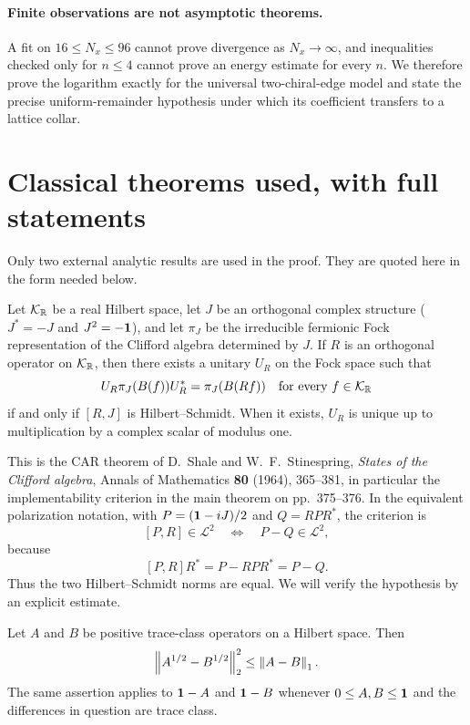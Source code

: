 \paragraph{Finite observations are not asymptotic theorems.}
A fit on $16\le N_x\le96$ cannot prove divergence as $N_x\to\infty$, and
inequalities checked only for $n\le4$ cannot prove an energy estimate for
every $n$.  We therefore prove the logarithm exactly for the universal
two-chiral-edge model and state the precise uniform-remainder hypothesis
under which its coefficient transfers to a lattice collar.

\section{Classical theorems used, with full statements}

Only two external analytic results are used in the proof.  They are
quoted here in the form needed below.

\begin{theorem}\label{thm:ss}
Let $\mathcal K_{\mathbb R}$ be a real Hilbert space, let $J$ be an orthogonal
complex structure ($J^*=-J$ and $J^2=-\mathbf 1$), and let $\pi_J$ be the
irreducible fermionic Fock representation of the Clifford algebra
determined by $J$.  If $R$ is an orthogonal operator on
$\mathcal K_{\mathbb R}$, then there exists a unitary $U_R$ on the Fock space
such that
\[
 U_R\pi_J(B(f))U_R^*=\pi_J(B(Rf))
 \quad\text{for every }f\in\mathcal K_{\mathbb R}
\]
if and only if $[R,J]$ is Hilbert--Schmidt.  When it exists, $U_R$ is
unique up to multiplication by a complex scalar of modulus one.
\end{theorem}

This is the CAR theorem of D.~Shale and W.~F.~Stinespring,
\emph{States of the Clifford algebra}, Annals of Mathematics
\textbf{80} (1964), 365--381, in particular the implementability
criterion in the main theorem on pp.~375--376.  In the equivalent
polarization notation, with $P=(\mathbf 1-iJ)/2$ and $Q=RPR^*$, the criterion
is
\[
 [P,R]\in\mathcal L^2
 \quad\Longleftrightarrow\quad
 P-Q\in\mathcal L^2,
\]
because
\[
 [P,R]R^*=P-RPR^*=P-Q.
\]
Thus the two Hilbert--Schmidt norms are equal.  We will verify the
hypothesis by an explicit estimate.

\begin{theorem}
\label{thm:ps}
Let $A$ and $B$ be positive trace-class operators on a Hilbert space.
Then
\[
 \left\lVert A^{1/2}-B^{1/2}\right\rVert_2^2\le \left\lVert A-B\right\rVert_1.
\]
The same assertion applies to $\mathbf 1-A$ and $\mathbf 1-B$ whenever
$0\le A,B\le\mathbf 1$ and the differences in question are trace class.
\end{theorem}

